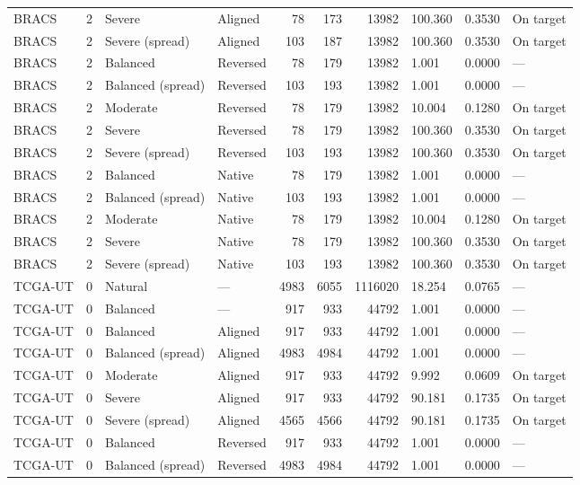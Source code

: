 \begin{longtable}{lrllrrrlll}
BRACS & 2 & Severe & Aligned & 78 & 173 & 13982 & 100.360 & 0.3530 & On target \\
BRACS & 2 & Severe (spread) & Aligned & 103 & 187 & 13982 & 100.360 & 0.3530 & On target \\
BRACS & 2 & Balanced & Reversed & 78 & 179 & 13982 & 1.001 & 0.0000 & --- \\
BRACS & 2 & Balanced (spread) & Reversed & 103 & 193 & 13982 & 1.001 & 0.0000 & --- \\
BRACS & 2 & Moderate & Reversed & 78 & 179 & 13982 & 10.004 & 0.1280 & On target \\
BRACS & 2 & Severe & Reversed & 78 & 179 & 13982 & 100.360 & 0.3530 & On target \\
BRACS & 2 & Severe (spread) & Reversed & 103 & 193 & 13982 & 100.360 & 0.3530 & On target \\
BRACS & 2 & Balanced & Native & 78 & 179 & 13982 & 1.001 & 0.0000 & --- \\
BRACS & 2 & Balanced (spread) & Native & 103 & 193 & 13982 & 1.001 & 0.0000 & --- \\
BRACS & 2 & Moderate & Native & 78 & 179 & 13982 & 10.004 & 0.1280 & On target \\
BRACS & 2 & Severe & Native & 78 & 179 & 13982 & 100.360 & 0.3530 & On target \\
BRACS & 2 & Severe (spread) & Native & 103 & 193 & 13982 & 100.360 & 0.3530 & On target \\
TCGA-UT & 0 & Natural & --- & 4983 & 6055 & 1116020 & 18.254 & 0.0765 & --- \\
TCGA-UT & 0 & Balanced & --- & 917 & 933 & 44792 & 1.001 & 0.0000 & --- \\
TCGA-UT & 0 & Balanced & Aligned & 917 & 933 & 44792 & 1.001 & 0.0000 & --- \\
TCGA-UT & 0 & Balanced (spread) & Aligned & 4983 & 4984 & 44792 & 1.001 & 0.0000 & --- \\
TCGA-UT & 0 & Moderate & Aligned & 917 & 933 & 44792 & 9.992 & 0.0609 & On target \\
TCGA-UT & 0 & Severe & Aligned & 917 & 933 & 44792 & 90.181 & 0.1735 & On target \\
TCGA-UT & 0 & Severe (spread) & Aligned & 4565 & 4566 & 44792 & 90.181 & 0.1735 & On target \\
TCGA-UT & 0 & Balanced & Reversed & 917 & 933 & 44792 & 1.001 & 0.0000 & --- \\
TCGA-UT & 0 & Balanced (spread) & Reversed & 4983 & 4984 & 44792 & 1.001 & 0.0000 & --- \\

\end{longtable}
